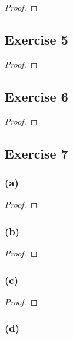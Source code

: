 \documentclass[14pt]{extarticle}
\begin{document}
\begin{proof}

\end{proof}

\subsection{Exercise 5}

\begin{proof}

\end{proof}

\subsection{Exercise 6}

\begin{proof}

\end{proof}

\subsection{Exercise 7}

\subsubsection{(a)}

\begin{proof}

\end{proof}

\subsubsection{(b)}

\begin{proof}

\end{proof}

\subsubsection{(c)}

\begin{proof}

\end{proof}

\subsubsection{(d)}
\end{document}
